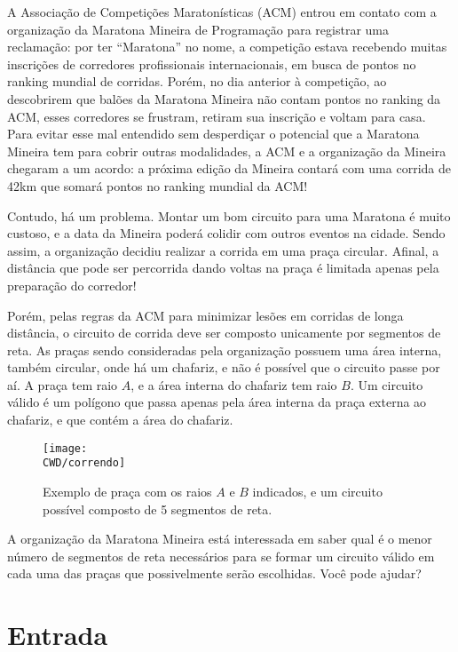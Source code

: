 A Associação de Competições Maratonísticas (ACM) entrou em contato com a organização da Maratona Mineira de Programação para registrar uma reclamação:
por ter ``Maratona'' no nome, a competição estava recebendo muitas inscrições de corredores profissionais internacionais, em busca de pontos no
ranking mundial de corridas. Porém, no dia anterior à competição,
ao descobrirem que balões da Maratona Mineira não contam pontos no ranking da ACM, esses corredores se frustram, retiram
sua inscrição e voltam para casa.
Para evitar esse mal entendido sem desperdiçar o potencial que a Maratona Mineira tem para cobrir outras modalidades,
a ACM e a organização da Mineira chegaram
a um acordo: a próxima edição da Mineira contará com uma corrida de 42km que somará pontos no ranking mundial da ACM!

Contudo, há um problema. Montar um bom circuito para uma Maratona é muito custoso, e a data da Mineira poderá colidir
com outros eventos na cidade. Sendo assim, a organização decidiu realizar a corrida em uma praça circular. Afinal, a distância que
pode ser percorrida dando voltas na praça é limitada apenas pela preparação do corredor!

Porém, pelas regras da ACM para minimizar lesões em corridas de longa distância, o circuito de corrida deve ser composto
unicamente por segmentos de reta.
As praças sendo consideradas pela organização possuem uma área interna, também circular, onde há um chafariz, e não é possível que o circuito
passe por aí. A praça tem raio $A$, e a área interna do chafariz tem raio $B$. Um circuito válido é um polígono que passa apenas pela área interna
da praça externa ao chafariz, e que contém a área do chafariz.

\begin{figure}[h]
\begin{center}
\texttt{[image: \\CWD/correndo]}
\begin{quote}
\caption{Exemplo de praça com os raios $A$ e $B$ indicados, e um circuito possível composto de 5 segmentos de reta.}
\end{quote}
\end{center}
\end{figure}

A organização da Maratona Mineira está interessada em saber qual é o menor número de segmentos de reta necessários para se formar um circuito
válido em cada uma das praças que possivelmente serão escolhidas. Você pode ajudar?

\section*{Entrada}

